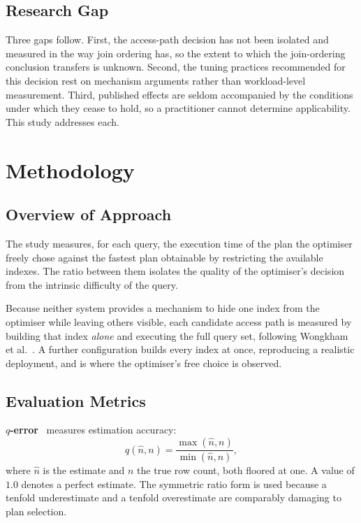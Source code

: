 \documentclass[12pt, a4paper]{article}
\begin{document}
\subsection{Research Gap}

Three gaps follow. First, the access-path decision has not been isolated
and measured in the way join ordering has, so the extent to which the
join-ordering conclusion transfers is unknown. Second, the tuning
practices recommended for this decision rest on mechanism arguments
rather than workload-level measurement. Third, published effects are
seldom accompanied by the conditions under which they cease to hold, so
a practitioner cannot determine applicability. This study addresses each.

\section{Methodology}
\label{sec:methodology}

\subsection{Overview of Approach}

The study measures, for each query, the execution time of the plan the
optimiser freely chose against the fastest plan obtainable by
restricting the available indexes. The ratio between them isolates the
quality of the optimiser's decision from the intrinsic difficulty of the
query.

Because neither system provides a mechanism to hide one index from the
optimiser while leaving others visible, each candidate access path is
measured by building that index \emph{alone} and executing the full
query set, following Wongkham et al.~\cite{wongkham2022updatable}. A
further configuration builds every index at once, reproducing a
realistic deployment, and is where the optimiser's free choice is
observed.

\subsection{Evaluation Metrics}
\label{sec:metrics}

\textbf{$q$-error}~\cite{moerkotte2009preventing} measures estimation
accuracy:
\begin{equation}
q(\hat{n}, n) = \frac{\max(\hat{n}, n)}{\min(\hat{n}, n)},
\end{equation}
where $\hat{n}$ is the estimate and $n$ the true row count, both floored
at one. A value of $1.0$ denotes a perfect estimate. The symmetric ratio
form is used because a tenfold underestimate and a tenfold overestimate
are comparably damaging to plan selection.
\end{document}
